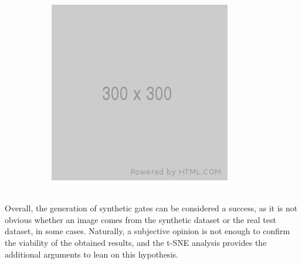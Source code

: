 \begin{figure}[h!]
\begin{subfigure}{0.35\textwidth}
	\end{subfigure}
	\begin{subfigure}{0.35\textwidth}
		\includegraphics[width=\textwidth]{figure/300x300.png}
	\end{subfigure}
	\caption[Synthetic versus real images comparison]{}
\end{figure}

~\\Overall, the generation of synthetic gates can be considered a success, as
it is not obvious whether an image comes from the synthetic dataset or the real
test dataset, in some cases. Naturally, a subjective opinion is not enough to
confirm the viability of the obtained results, and the t-SNE analysis provides
the additional arguments to lean on this hypothesis.
\newpage

